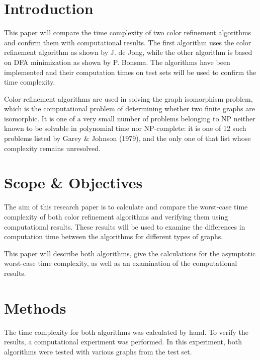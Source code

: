 \documentclass[twoside]{article}
\begin{document}
\begin{multicols}{2} %



\section{Introduction}
\label{intro}
This paper will compare the time complexity of two color refinement algorithms and confirm them with computational results. The first algorithm uses the color refinement algorithm as shown by J. de Jong\cite{presentation:slidesPartI}, while the other algorithm is based on DFA minimization as shown by P. Bonsma\cite{presentation:slidesPartIII}. The algorithms have been implemented and their computation times on test sets will be used to confirm the time complexity.

Color refinement algorithms are used in solving the graph isomorphism problem, which is the computational problem of determining whether two finite graphs are isomorphic. It is one of a very small number of problems belonging to NP neither known to be solvable in polynomial time nor NP-complete: it is one of 12 such problems listed by Garey \& Johnson (1979)\cite{book:gareyJohnson1979}, and the only one of that list whose complexity remains unresolved.\cite{website:wikiGI}

\section{Scope \& Objectives}
\label{scope}
The aim of this research paper is to calculate and compare the worst-case time complexity of both color refinement algorithms and verifying them using computational results. These results will be used to examine the differences in computation time between the algorithms for different types of graphs.

This paper will describe both algorithms, give the calculations for the asymptotic worst-case time complexity, as well as an examination of the computational results.
\section{Methods}
\label{methods}
The time complexity for both algorithms was calculated by hand. To verify the results, a computational experiment was performed. In this experiment, both algorithms were tested with various graphs from the test set.


\end{multicols}
\end{document}
